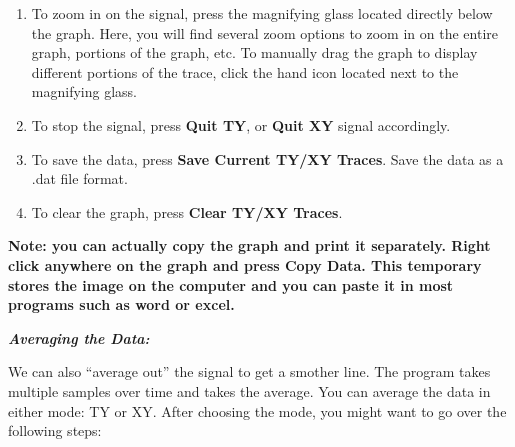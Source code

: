 \documentclass{../lab}
\begin{document}
\begin{enumerate}
    \item To zoom in on the signal, press the magnifying glass located directly below the graph. Here, you will find several zoom options to zoom in on the entire graph, portions of the graph, etc. To manually drag the graph to display different portions of the trace, click the hand icon located next to the magnifying glass.
    
    \item To stop the signal, press \textbf{Quit TY}, or \textbf{Quit XY} signal accordingly.
    
    \item To save the data, press \textbf{Save Current TY/XY Traces}. Save the data as a .dat file format.
    
    \item To clear the graph, press \textbf{Clear TY/XY Traces}.
\end{enumerate}

\textbf{Note: you can actually copy the graph and print it separately. Right click anywhere on the graph and press Copy Data. This temporary stores the image on the computer and you can paste it in most programs such as word or excel.}

\emph{\textbf{Averaging the Data:}}

We can also ``average out'' the signal to get a smother line. The program takes multiple samples over time and takes the average. You can average the data in either mode: TY or XY. After choosing the mode, you might want to go over the following steps:
\end{document}
